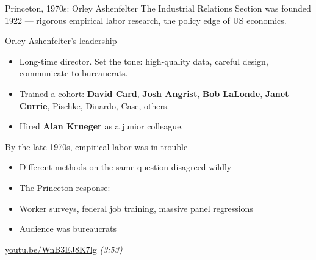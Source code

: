 \documentclass[aspectratio=169,11pt]{beamer}
\begin{document}
\begin{frame}{Princeton, 1970s: Orley Ashenfelter}
\vspace{0.3em}
\footnotesize
The Industrial Relations Section was founded 1922 --- rigorous empirical labor research, the policy edge of US economics.
\vspace{0.3em}
\begin{block}{Orley Ashenfelter's leadership}
\begin{itemize}
  \item Long-time director. Set the tone: high-quality data, careful design, communicate to bureaucrats.
  \item Trained a cohort: \textbf{David Card}, \textbf{Josh Angrist}, \textbf{Bob LaLonde}, \textbf{Janet Currie}, Pischke, Dinardo, Case, others.
  \item Hired \textbf{Alan Krueger} as a junior colleague.
\end{itemize}
\end{block}
\end{frame}

\begin{frame}{By the late 1970s, empirical labor was in trouble}
\vspace{0.4em}
\begin{itemize}
  \item Different methods on the same question disagreed wildly
  \item The Princeton response: 
  \item Worker surveys, federal job training, massive panel regressions
  \item Audience was bureaucrats
\end{itemize}
\vspace{0.6em}
\vspace{0.6em}
\begin{center}
\href{https://www.youtube.com/watch?v=WnB3EJ8K7lg\&t=14s}{\color{ocean}\underline{youtu.be/WnB3EJ8K7lg}} \;\small\color{warmgray}\itshape (3:53)
\end{center}
\end{frame}

\end{document}
